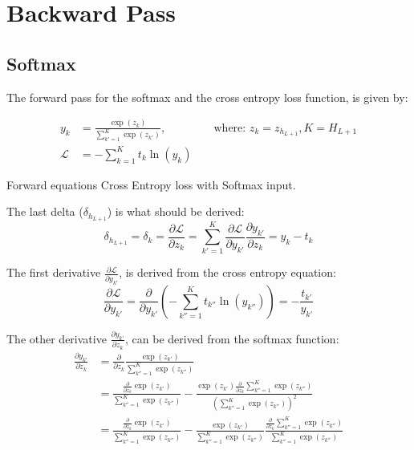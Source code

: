 \chapter{Backward Pass}

\section{Softmax}
\label{appendix:backward-pass:softmax}

The forward pass for the softmax and the cross entropy loss function, is given by:

\begin{equationbox}[H]
\begin{equation*}
\begin{aligned}
y_k &= \frac{\exp(z_k)}{\sum_{k'=1}^K \exp(z_{k'})}, && \text{ where: } z_k=z_{h_{L+1}}, K = H_{L + 1} \\
\mathcal{L} &= - \sum_{k=1}^K t_k \ln(y_k)
\end{aligned}
\end{equation*}
\caption{Forward equations Cross Entropy loss with Softmax input.}
\end{equationbox}

The last delta ($\delta_{h_{L+1}}$) is what should be derived:
\begin{equation}
\delta_{h_{L + 1}} = \delta_k = \frac{\partial \mathcal{L}}{\partial z_k} = \sum_{k'=1}^K \frac{\partial \mathcal{L}}{\partial y_{k'}} \frac{\partial y_{k'}}{\partial z_k} = y_k - t_k
\label{appendix:backprop:softmax:bprop-delta-last}
\end{equation}

The first derivative $\frac{\partial \mathcal{L}}{\partial y_{k'}}$, is derived from the cross entropy equation:
\begin{equation}
\frac{\partial \mathcal{L}}{\partial y_{k'}} = \frac{\partial}{\partial y_{k'}} \left(- \sum_{k''=1}^K t_{k''} \ln(y_{k''})\right) = -\frac{t_{k'}}{y_{k'}}
\label{appendix:backprop:softmax:bprop-Ldy}
\end{equation}

The other derivative $\frac{\partial y_{k'}}{\partial z_k}$, can be derived from the softmax function:
\begin{equation}
\begin{aligned}
\frac{\partial y_{k'}}{\partial z_k}
&= \frac{\partial}{\partial z_k} \frac{\exp(z_{k'})}{\sum_{k''=1}^K \exp(z_{k''})} \\
&= \frac{\frac{\partial}{\partial z_k} \exp(z_{k'})}{\sum_{k''=1}^K \exp(z_{k''})}
- \frac{\exp(z_{k'}) \frac{\partial}{\partial z_k} \sum_{k''=1}^K \exp(z_{k''})}{\left(\sum_{k''=1}^K \exp(z_{k''})\right)^2} \\
&= \frac{\frac{\partial}{\partial z_k} \exp(z_{k'})}{\sum_{k''=1}^K \exp(z_{k''})}
- \frac{\exp(z_{k'})}{\sum_{k''=1}^K \exp(z_{k''})} \frac{\frac{\partial}{\partial z_k} \sum_{k''=1}^K \exp(z_{k''})}{\sum_{k''=1}^K \exp(z_{k''})}
\end{aligned}
\end{equation}

